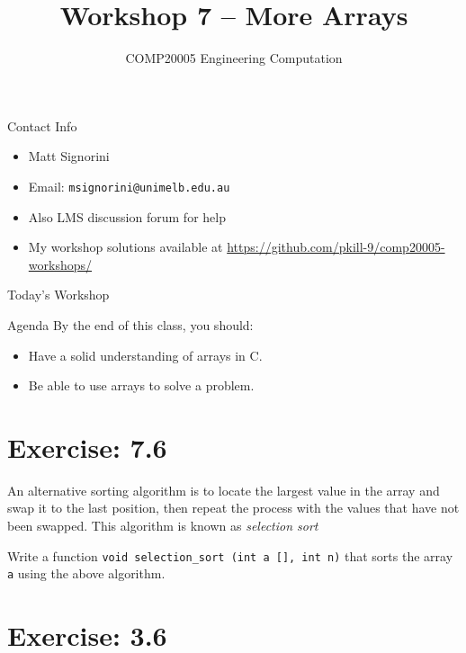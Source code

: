 \documentclass{beamer}
\title{Workshop 7 -- More Arrays}
\author{COMP20005 Engineering Computation}
\institute{The University of Melbourne}
\begin{document}
\renewcommand{\tt}[1]{\texttt{#1}}

\begin{frame}
    \titlepage
\end{frame}

\begin{frame}{Contact Info}
    \begin{itemize}
        \item Matt Signorini
        \item Email: \tt{msignorini@unimelb.edu.au}
        \item Also LMS discussion forum for help
        \item My workshop solutions available at \url{https://github.com/pkill-9/comp20005-workshops/}
    \end{itemize}
\end{frame}

\begin{frame}{Today's Workshop}
    \begin{block}{Agenda}
        By the end of this class, you should:
        \begin{itemize}
            \item Have a solid understanding of arrays in C.
            \item Be able to use arrays to solve a problem.
        \end{itemize}
    \end{block}
\end{frame}

\section{Exercise: 7.6}

\begin{frame}{7.6}
    An alternative sorting algorithm is to locate the largest value in the
    array and swap it to the last position, then repeat the process with
    the values that have not been swapped. This algorithm is known as
    \emph{selection sort}

    Write a function \tt{void selection\_sort (int a [], int n)} that sorts
    the array \tt{a} using the above algorithm.
\end{frame}

\section{Exercise: 3.6}
\end{document}
